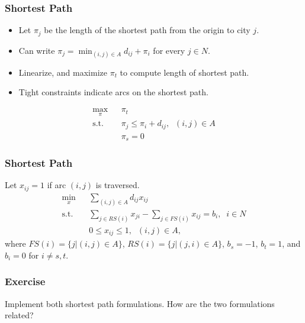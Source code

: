 \documentclass[12pt,handout]{beamer}
\begin{document}
\begin{frame}
\frametitle{Shortest Path}
\begin{itemize}
\item Let $\pi_j$ be the length of the shortest path from the origin to city $j$.
\item Can write $\pi_j = \min_{(i,j) \in A} d_{ij} + \pi_i$ for every $j \in N$.
\item Linearize, and maximize $\pi_t$ to compute length of shortest path.
\item Tight constraints indicate arcs on the shortest path.
\end{itemize}
\begin{eqnarray}
\max_{\pi} && \pi_t \nonumber \\
\mbox{s.t.} && \pi_j \le \pi_i + d_{ij},\;\;(i,j) \in A \nonumber \\
&& \pi_s = 0 \nonumber
\end{eqnarray}
\end{frame}

\begin{frame}
\frametitle{Shortest Path}
Let $x_{ij} = 1$ if arc $(i,j)$ is traversed.
\begin{eqnarray}
\min_x && \sum_{(i,j) \in A} d_{ij} x_{ij} \nonumber \\
\mbox{s.t.} && \sum_{j \in RS(i)} x_{ji} - \sum_{j \in FS(i)} x_{ij} = b_i,\;\;i \in N \nonumber \\
&& 0 \le x_{ij} \le 1,\;\;(i,j) \in A, \nonumber
\end{eqnarray}
\noindent where $FS(i) = \{j | (i,j) \in A\}$, $RS(i) = \{j | (j, i) \in A\}$, $b_s = -1$, $b_t = 1$, and $b_i = 0$ for $i \neq s, t$.
\end{frame}

\begin{frame}
\frametitle{Exercise}
Implement both shortest path formulations. How are the two formulations related?
\end{frame}
\end{document}
